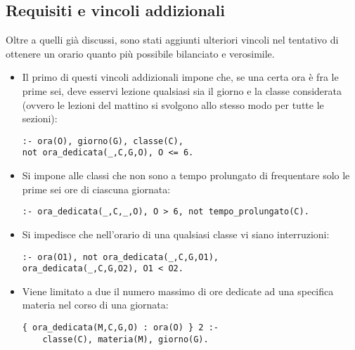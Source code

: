 \subsection{Requisiti e vincoli addizionali}
Oltre a quelli già discussi, sono stati aggiunti ulteriori vincoli nel tentativo di ottenere un orario quanto più possibile bilanciato e verosimile.

\begin{itemize}[leftmargin=0pt]

\item Il primo di questi vincoli addizionali impone che, se una certa ora è fra le prime sei, deve esservi lezione qualsiasi sia il giorno e la classe considerata (ovvero le lezioni del mattino si svolgono allo stesso modo per tutte le sezioni):
\begin{lstlisting}[frame=single]
:- ora(O), giorno(G), classe(C),
not ora_dedicata(_,C,G,O), O <= 6.
\end{lstlisting} 

\item Si impone alle classi che non sono a tempo prolungato di frequentare solo le prime sei ore di ciascuna giornata:
\begin{lstlisting}[frame=single]
:- ora_dedicata(_,C,_,O), O > 6, not tempo_prolungato(C).
\end{lstlisting} 

\item Si impedisce che nell'orario di una qualsiasi classe vi siano interruzioni:
\begin{lstlisting}[frame=single]
:- ora(O1), not ora_dedicata(_,C,G,O1),
ora_dedicata(_,C,G,O2), O1 < O2.
\end{lstlisting} 

\item Viene limitato a due il numero massimo di ore dedicate ad una specifica materia nel corso di una giornata:
\begin{lstlisting}[frame=single]
{ ora_dedicata(M,C,G,O) : ora(O) } 2 :- 
	classe(C), materia(M), giorno(G).
\end{lstlisting}


\end{itemize}
